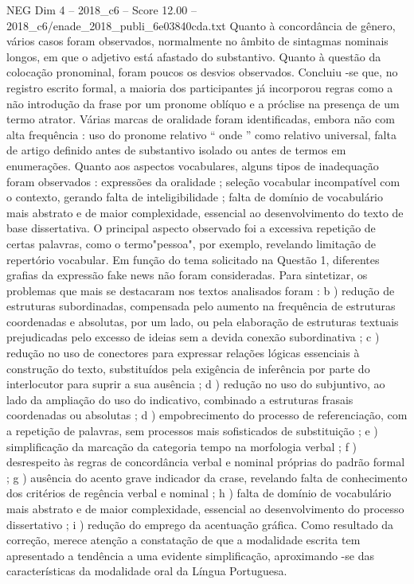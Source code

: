 \begin{textsample}{NEG Dim 4 – 2018\_c6 – Score 12.00 – 2018\_c6/enade\_2018\_publi\_6e03840cda.txt}
Quanto à concordância de gênero, vários casos foram observados, normalmente no âmbito de sintagmas nominais longos, em que o adjetivo está afastado do substantivo.
Quanto à questão da colocação pronominal, foram poucos os desvios observados.
Concluiu -se que, no registro escrito formal, a maioria dos participantes já incorporou regras como a não introdução da frase por um pronome oblíquo e a próclise na presença de um termo atrator.
Várias marcas de oralidade foram identificadas, embora não com alta frequência : uso do pronome relativo “ onde ” como relativo universal, falta de artigo definido antes de substantivo isolado ou antes de termos em enumerações.
Quanto aos aspectos vocabulares, alguns tipos de inadequação foram observados : expressões da oralidade ; seleção vocabular incompatível com o contexto, gerando falta de inteligibilidade ; falta de domínio de vocabulário mais abstrato e de maior complexidade, essencial ao desenvolvimento do texto de base dissertativa.
O principal aspecto observado foi a excessiva repetição de certas palavras, como o termo"pessoa", por exemplo, revelando limitação de repertório vocabular.
Em função do tema solicitado na Questão 1, diferentes grafias da expressão fake news não foram consideradas.
Para sintetizar, os problemas que mais se destacaram nos textos analisados foram : b ) redução de estruturas subordinadas, compensada pelo aumento na frequência de estruturas coordenadas e absolutas, por um lado, ou pela elaboração de estruturas textuais prejudicadas pelo excesso de ideias sem a devida conexão subordinativa ; c ) redução no uso de conectores para expressar relações lógicas essenciais à construção do texto, substituídos pela exigência de inferência por parte do interlocutor para suprir a sua ausência ; d ) redução no uso do subjuntivo, ao lado da ampliação do uso do indicativo, combinado a estruturas frasais coordenadas ou absolutas ; d ) empobrecimento do processo de referenciação, com a repetição de palavras, sem processos mais sofisticados de substituição ; e ) simplificação da marcação da categoria tempo na morfologia verbal ; f ) desrespeito às regras de concordância verbal e nominal próprias do padrão formal ; g ) ausência do acento grave indicador da crase, revelando falta de conhecimento dos critérios de regência verbal e nominal ; h ) falta de domínio de vocabulário mais abstrato e de maior complexidade, essencial ao desenvolvimento do processo dissertativo ; i ) redução do emprego da acentuação gráfica.
Como resultado da correção, merece atenção a constatação de que a modalidade escrita tem apresentado a tendência a uma evidente simplificação, aproximando -se das características da modalidade oral da Língua Portuguesa.

\end{textsample}
